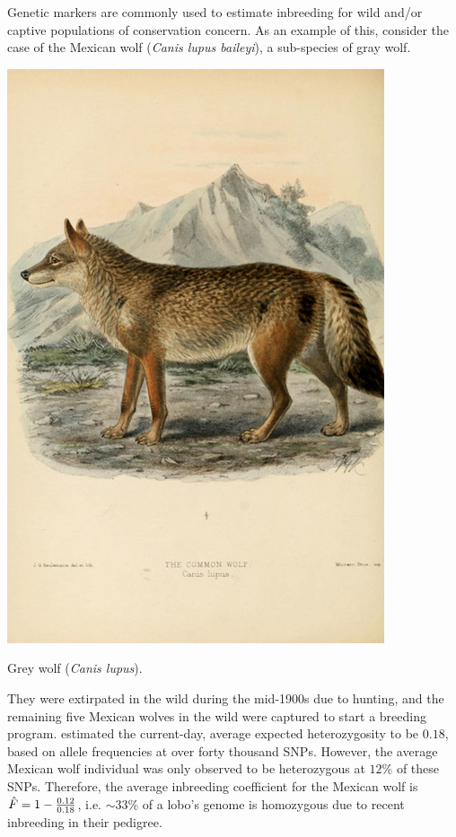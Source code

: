 Genetic markers are commonly used to estimate inbreeding for wild
and/or captive populations of conservation concern. As an example of
this, consider the case of the Mexican wolf ({\it Canis lupus baileyi}), a sub-species of gray wolf. \begin{marginfigure}[-2cm]
\begin{center}
  \includegraphics[width= \textwidth]{illustration_images/alleles_genotypes/grey_wolf/5988399184_0c36a8e51c_z.jpg}
\end{center}
\caption{Grey wolf ({\it Canis lupus}). } \label{fig:Grey_wolf}
\end{marginfigure} They were extirpated in the wild during the mid-1900s due to hunting, and the remaining five Mexican wolves in the wild were captured to start a breeding program. \citet{vonHoldt:11} estimated the current-day, average expected heterozygosity to be $0.18$, based on allele frequencies at over forty thousand SNPs. However, the average Mexican wolf individual was only observed to be heterozygous at $12\%$ of these SNPs. Therefore, the average inbreeding coefficient for the Mexican wolf is $\hat{F} = 1 -\nicefrac{0.12}{0.18}$, i.e. $\sim 33 \%$ of a lobo's genome is homozygous due to recent inbreeding in their pedigree.

